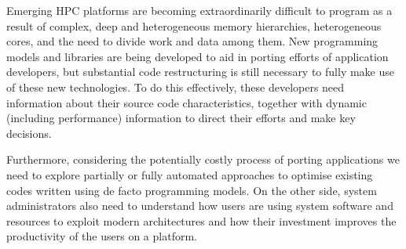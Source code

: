 Emerging HPC platforms are becoming extraordinarily difficult to program as a result of complex, deep and heterogeneous memory hierarchies, heterogeneous cores, and the need to divide work and data among them.
New programming models and libraries are being developed to aid in porting efforts of application developers, but substantial code restructuring is still necessary to fully make use of these new technologies.
To do this effectively, these developers need information about their source code characteristics, together with dynamic (including performance) information to direct their efforts and make key decisions.



Furthermore, considering the potentially costly process of porting applications we need to explore partially or fully automated approaches to optimise existing codes written using de facto programming models.
On the other side, system administrators also need to understand how users are using system software and resources to exploit modern architectures and how their investment improves the productivity of the users on a platform.

